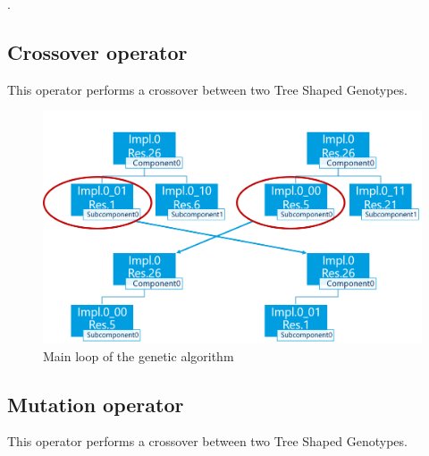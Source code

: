 .

\subsection{Crossover operator}
This operator performs a crossover between two Tree Shaped Genotypes. 

\begin{figure}
	\centering
	\includegraphics[width=\textwidth]{images/GeneticSolverCrossover.png}
	\caption{Main loop of the genetic algorithm}
	\label{fig:GeneticSolverCrossover}
\end{figure}



\subsection{Mutation operator}
This operator performs a crossover between two Tree Shaped Genotypes. 

